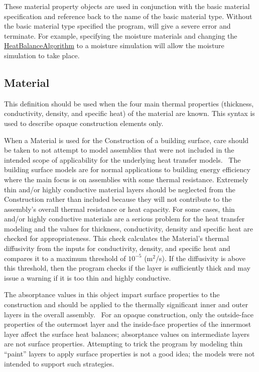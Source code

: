 These material property objects are used in conjunction with the basic material specification and reference back to the name of the basic material type. Without the basic material type specified the program, will give a severe error and terminate. For example, specifying the moisture materials and changing the \hyperref[heatbalancealgorithm]{HeatBalanceAlgorithm} to a moisture simulation will allow the moisture simulation to take place.

\subsection{Material}\label{material}

This definition should be used when the four main thermal properties (thickness, conductivity, density, and specific heat) of the material are known. This syntax is used to describe opaque construction elements only.

When a Material is used for the Construction of a building surface, care should be taken to not attempt to model assemblies that were not included in the intended scope of applicability for the underlying heat transfer models.~ The building surface models are for normal applications to building energy efficiency where the main focus is on assemblies with some thermal resistance. Extremely thin and/or highly conductive material layers should be neglected from the Construction rather than included because they will not contribute to the assembly's overall thermal resistance or heat capacity. For some cases, thin and/or highly conductive materials are a serious problem for the heat transfer modeling and the values for thickness, conductivity, density and specific heat are checked for appropriateness. This check calculates the Material's thermal diffusivity from the inputs for conductivity, density, and specific heat and compares it to a maximum threshold of $10^{-5}$ (m\(^{2}\)/s). If the diffusivity is above this threshold, then the program checks if the layer is sufficiently thick and may issue a warning if it is too thin and highly conductive.

The absorptance values in this object impart surface properties to the construction and should be applied to the thermally significant inner and outer layers in the overall assembly.~ For an opaque construction, only the outside-face properties of the outermost layer and the inside-face properties of the innermost layer affect the surface heat balances; absorptance values on intermediate layers are not surface properties. Attempting to trick the program by modeling thin ``paint'' layers to apply surface properties is not a good idea; the models were not intended to support such strategies.

